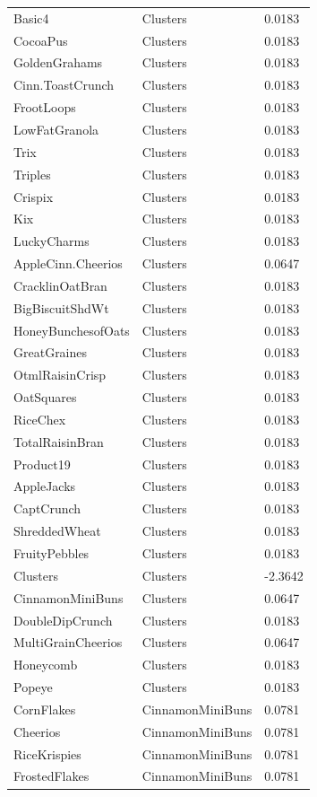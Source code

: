 \begin{table}[!htbp]
\begin{tabular}{lll}
Basic4 & Clusters & 0.0183
\\
CocoaPus & Clusters & 0.0183
\\
GoldenGrahams & Clusters & 0.0183
\\
Cinn.ToastCrunch & Clusters & 0.0183
\\
FrootLoops & Clusters & 0.0183
\\
LowFatGranola & Clusters & 0.0183
\\
Trix & Clusters & 0.0183
\\
Triples & Clusters & 0.0183
\\
Crispix & Clusters & 0.0183
\\
Kix & Clusters & 0.0183
\\
LuckyCharms & Clusters & 0.0183
\\
AppleCinn.Cheerios & Clusters & 0.0647
\\
CracklinOatBran & Clusters & 0.0183
\\
BigBiscuitShdWt & Clusters & 0.0183
\\
HoneyBunchesofOats & Clusters & 0.0183
\\
GreatGraines & Clusters & 0.0183
\\
OtmlRaisinCrisp & Clusters & 0.0183
\\
OatSquares & Clusters & 0.0183
\\
RiceChex & Clusters & 0.0183
\\
TotalRaisinBran & Clusters & 0.0183
\\
Product19 & Clusters & 0.0183
\\
AppleJacks & Clusters & 0.0183
\\
CaptCrunch & Clusters & 0.0183
\\
ShreddedWheat & Clusters & 0.0183
\\
FruityPebbles & Clusters & 0.0183
\\
Clusters & Clusters & -2.3642
\\
CinnamonMiniBuns & Clusters & 0.0647
\\
DoubleDipCrunch & Clusters & 0.0183
\\
MultiGrainCheerios & Clusters & 0.0647
\\
Honeycomb & Clusters & 0.0183
\\
Popeye & Clusters & 0.0183
\\
CornFlakes & CinnamonMiniBuns & 0.0781
\\
Cheerios & CinnamonMiniBuns & 0.0781
\\
RiceKrispies & CinnamonMiniBuns & 0.0781
\\
FrostedFlakes & CinnamonMiniBuns & 0.0781

\end{tabular}
\end{table}
